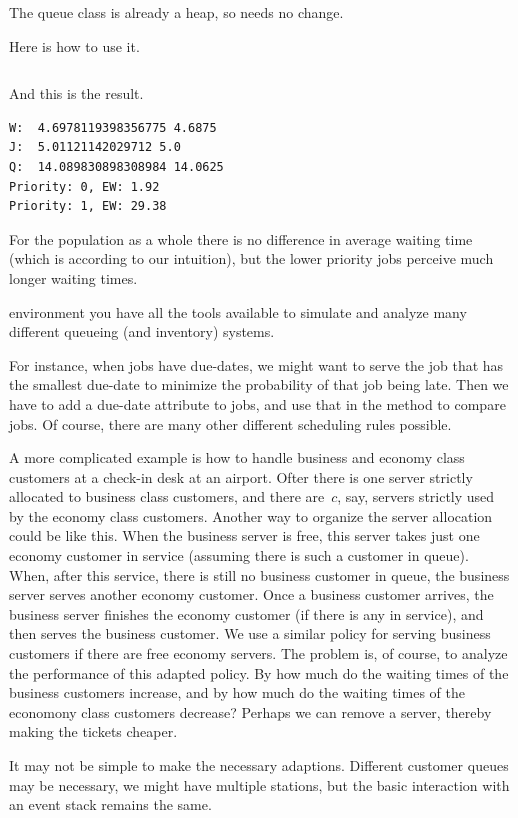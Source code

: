 \documentclass[queueing-book.tex]{subfiles}
\begin{document}
The queue class is already a heap, so needs no change.

Here is how to use it.
\inputminted[label=priority-jobs.py]{python}{../code/event_stacks/priority_jobs.py}
And this is the result.
\begin{verbatim}
W:  4.6978119398356775 4.6875
J:  5.01121142029712 5.0
Q:  14.089830898308984 14.0625
Priority: 0, EW: 1.92
Priority: 1, EW: 29.38
\end{verbatim}
For the population as a whole there is no difference in average waiting time (which is according to our intuition), but the lower priority jobs perceive much longer waiting times.


 environment you have all the tools available to simulate and analyze many different queueing (and inventory) systems.

For instance, when jobs have due-dates, we might want to serve the job that has the smallest due-date to minimize the probability of that job being late.
Then we have to add a due-date attribute to jobs, and use that in the method   to compare jobs.
Of course, there are many other different scheduling rules possible.

A more complicated example is how to handle business and economy class customers at a check-in desk at an airport.
Ofter there is one server strictly allocated to business class customers, and there are~$c$, say, servers strictly used by the economy class customers.
Another way to organize the server allocation could be like this.
When the business server is free, this server takes just one economy customer in service (assuming there is such a customer in queue).
When, after this service, there is still no business customer in queue, the business server serves another economy customer.
Once a business customer arrives, the business server finishes the economy customer (if there is any in service), and then serves the business customer.
We use a similar policy for serving business customers if there are free economy servers.
The problem is, of course, to analyze the performance of this adapted policy.
By how much do the waiting times of the business customers increase, and by how much do the waiting times of the economony class customers decrease? Perhaps  we can remove a server, thereby making the tickets cheaper.

It may not be simple to make the necessary adaptions.
Different customer queues may be necessary, we might have multiple stations, but the basic interaction with an event stack remains the same.
\end{document}
